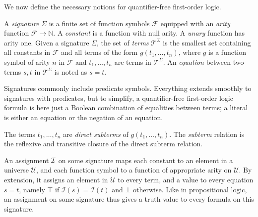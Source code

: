 \documentclass[smallextended]{svjour3}
\begin{document}
We now define the necessary notions for quantifier-free first-order logic.
\begin{definition}
A \emph{signature} $\Sigma$ is a finite set of function symbols $\mathcal{F}$
equipped with an \emph{arity} function $\mathcal{F} \rightarrow \mathbb{N}$.  A
\emph{constant} is a function with null arity.  A \emph{unary} function has
arity one.  Given a signature $\Sigma$, the set of \emph{terms}
$\mathcal{T}^{\Sigma}$ is the smallest set containing all constants in
$\mathcal{F}$ and all terms of the form $g(t_1,\ldots, t_n)$, where $g$ is a
function symbol of arity $n$ in $\mathcal{F}$ and $t_1,\ldots,t_n$ are terms in $\mathcal{T}^{\Sigma}$.  An \emph{equation} between two terms $s,t$ in $\mathcal{T}^{\Sigma}$ is noted as $s=t$.
\end{definition}
Signatures commonly include predicate symbols.  Everything extends smoothly to
signatures with predicates, but to simplify, a quantifier-free first-order logic
formula is here just a Boolean combination of equalities between terms; a
literal is either an equation or the negation of an equation.

The terms $t_1,\ldots,t_n$ are \emph{direct subterms} of $g(t_1,\ldots,t_n)$.  The \emph{subterm} relation is the reflexive and transitive closure of the direct subterm relation.

An assignment ${\cal I}$ on some signature maps each constant to an element in a
universe $\mathcal{U}$, and each function symbol to a function of appropriate
arity on $\mathcal{U}$.  By extension, it assigns an element in $\mathcal{U}$ to
every term, and a value to every equation $s=t$, namely $\top$ if
$\mathcal{I}(s) = \mathcal{I}(t)$ and $\bot$ otherwise.  Like in propositional
logic, an assignment on some signature thus gives a truth value to every
formula on this signature.
\end{document}

